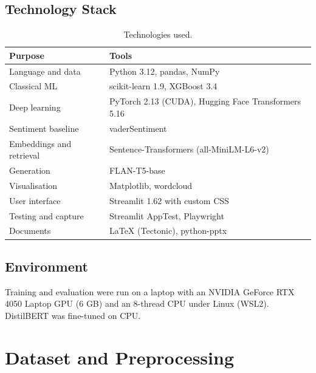 \documentclass[12pt,a4paper]{report}
\begin{document}
\section{Technology Stack}
\begin{table}[htbp]
\centering
\caption{Technologies used.}
\small
\begin{tabularx}{\textwidth}{@{}>{\raggedright\arraybackslash}p{4.2cm}X@{}}
\toprule
Purpose & Tools \\
\midrule
Language and data & Python 3.12, pandas, NumPy \\
Classical ML & scikit-learn 1.9, XGBoost 3.4 \\
Deep learning & PyTorch 2.13 (CUDA), Hugging Face Transformers 5.16 \\
Sentiment baseline & vaderSentiment \\
Embeddings and retrieval & Sentence-Transformers (all-MiniLM-L6-v2) \\
Generation & FLAN-T5-base \\
Visualisation & Matplotlib, wordcloud \\
User interface & Streamlit 1.62 with custom CSS \\
Testing and capture & Streamlit AppTest, Playwright \\
Documents & LaTeX (Tectonic), python-pptx \\
\bottomrule
\end{tabularx}
\end{table}

\section{Environment}
Training and evaluation were run on a laptop with an NVIDIA GeForce RTX 4050 Laptop GPU (6 GB) and an 8-thread CPU under Linux (WSL2). DistilBERT was fine-tuned on CPU.

\chapter{Dataset and Preprocessing}
\end{document}
